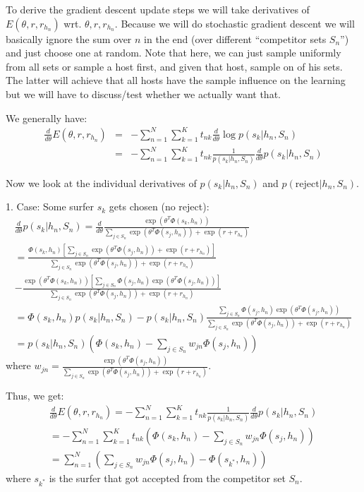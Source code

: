 To derive the gradient descent update steps we will take derivatives of $E(\theta, r, r_{h_n})$ wrt. $\theta, r, r_{h_n}$. Because we will do stochastic gradient descent we will basically ignore the sum over $n$ in the end (over different ``competitor sets $S_n$'') and just choose one at random. Note that here, we can just sample uniformly from all sets or sample a host first, and given that host, sample on of his sets. The latter will achieve that all hosts have the sample influence on the learning but we will have to discuss/test whether we actually want that.

We generally have:
\begin{eqnarray}
\frac{d}{d \theta} E(\theta, r, r_{h_n}) &=& - \sum_{n=1}^N \sum_{k=1}^K t_{nk} \frac{d}{d \theta}  \log p(s_k | h_n, S_n) \\
&=& - \sum_{n=1}^N \sum_{k=1}^K t_{nk} \frac{1}{p(s_k | h_n, S_n)} \frac{d}{d \theta} p(s_k | h_n, S_n)
\end{eqnarray}

Now we look at the individual derivatives of $p(s_k | h_n, S_n)$ and $p(\text{reject} | h_n, S_n)$.

1. Case: Some surfer $s_k$ gets chosen (no reject):
\begin{eqnarray}
\frac{d}{d \theta} p(s_k | h_n, S_n) = \frac{d}{d \theta} \frac{\exp(\theta^T \Phi(s_k,h_n))}{\sum_{j \in S_n} \exp(\theta^T \Phi(s_j,h_n)) + \exp(r + r_{h_n})} \\
= \frac{\Phi(s_k,h_n) [\sum_{j \in S_n} \exp(\theta^T \Phi(s_j,h_n)) + \exp(r + r_{h_n})]}{\sum_{j \in S_n} \exp(\theta^T \Phi(s_j,h_n)) + \exp(r + r_{h_n})} \\
- \frac{\exp(\theta^T \Phi(s_k,h_n)) [\sum_{j \in S_n} \Phi(s_j,h_n) \exp(\theta^T \Phi(s_j,h_n))]}{\sum_{j \in S_n} \exp(\theta^T \Phi(s_j,h_n)) + \exp(r + r_{h_n})}\\
= \Phi(s_k,h_n) p(s_k | h_n, S_n) - p(s_k | h_n, S_n) \frac{\sum_{j \in S_n} \Phi(s_j,h_n) \exp(\theta^T \Phi(s_j,h_n))}{\sum_{j \in S_n} \exp(\theta^T \Phi(s_j,h_n)) + \exp(r + r_{h_n})}\\
= p(s_k | h_n, S_n) (\Phi(s_k,h_n) - \sum_{j \in S_n} w_{jn} \Phi(s_j,h_n))
\end{eqnarray}
where $w_{jn}=\frac{\exp(\theta^T \Phi(s_j,h_n))}{\sum_{j \in S_n} \exp(\theta^T \Phi(s_j,h_n)) + \exp(r + r_{h_n})}$.

Thus, we get:
\begin{eqnarray}
\frac{d}{d \theta} E(\theta, r, r_{h_n}) = - \sum_{n=1}^N \sum_{k=1}^K t_{nk} \frac{1}{p(s_k | h_n, S_n)} \frac{d}{d \theta} p(s_k | h_n, S_n)\\
= - \sum_{n=1}^N \sum_{k=1}^K t_{nk} (\Phi(s_k,h_n) - \sum_{j \in S_n} w_{jn} \Phi(s_j,h_n)) \\
= \sum_{n=1}^N (\sum_{j \in S_n} w_{jn} \Phi(s_j,h_n) - \Phi(s_{k^*},h_n))
\end{eqnarray}
where $s_{k^*}$ is the surfer that got accepted from the competitor set $S_n$.

